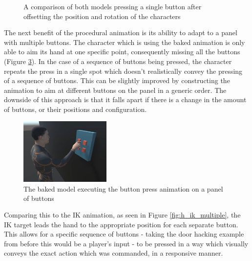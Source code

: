 \begin{figure}[h!]
\begin{subfigure}{0.4\textwidth}
        \label{fig:h_ik_offset}
    \end{subfigure}
    \caption{A comparison of both models pressing a single button after
    offsetting the position and rotation of the characters}
    \label{fig:h_offset}
\end{figure}

The next benefit of the procedural animation is its ability to adapt to a panel
with multiple buttons. The character which is using the baked animation is only
able to aim its hand at one specific point, consequently missing all the buttons
(Figure \ref{fig:h_b_multiple}). In the case of a sequence of buttons being
pressed, the character repeats the press in a single spot which doesn't
realistically convey the pressing of a sequence of buttons. This can be slightly
improved by constructing the animation to aim at different buttons on the panel
in a generic order. The downside of this approach is that it falls apart if there
is a change in the amount of buttons, or their positions and configuration. 

\begin{figure}[h!]
    \centering
    \captionsetup{justification=centering}
    \includegraphics[width=0.4\textwidth]{grafika/h_b_multiple.png}
    \caption{The baked model executing the button press animation on a panel of
    buttons}
    \label{fig:h_b_multiple}
\end{figure}

Comparing this to the IK animation, as seen in Figure \ref{fig:h_ik_multiple},
the IK target leads the hand to the appropriate position for each separate
button. This allows for a specific sequence of buttons - taking the door hacking
example from before this would be a player's input - to be pressed in a way
which visually conveys the exact action which was commanded, in a responsive
manner.

